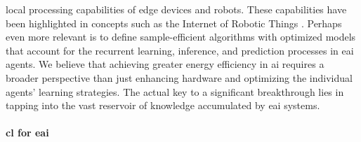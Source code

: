 \documentclass[12pt]{article}
\begin{document}
local processing capabilities of edge devices and robots. These capabilities have been highlighted in concepts such as the Internet of Robotic Things \cite{Vermesan2020InternetRoboticThings,Sekala2024SelectedIssuesMethods}. Perhaps even more relevant is to define sample-efficient algorithms with optimized models that account for the recurrent learning, inference, and prediction processes in \ac{eai} agents. We believe that achieving greater energy efficiency in \ac{ai} requires a broader perspective than just enhancing hardware and optimizing the individual agents' learning strategies. The actual key to a significant breakthrough lies in tapping into the vast reservoir of knowledge accumulated by \ac{eai} systems.

\paragraph*{\Acl{cl} for \ac{eai}}
\end{document}
